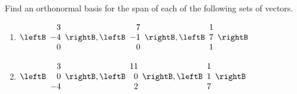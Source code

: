 \begin{enumialphparenastyle}

\begin{ex} Find an orthonormal basis for the span of each of the following sets of
vectors.

\begin{enumerate}
\item $\leftB
\begin{array}{r}
 3 \\
-4 \\
0
\end{array}
\rightB ,\leftB
\begin{array}{r}
 7 \\
-1 \\
0
\end{array}
\rightB ,\leftB
\begin{array}{r}
 1 \\
7 \\
1
\end{array}
\rightB $

\item $\leftB
\begin{array}{r}
3 \\
0 \\
-4
\end{array}
\rightB ,\leftB
\begin{array}{r}
 11 \\
0 \\
2
\end{array}
\rightB ,\leftB
\begin{array}{r}
1 \\
1 \\
7
\end{array}
\rightB $


\end{enumerate}
\end{ex}
\end{enumialphparenastyle}
